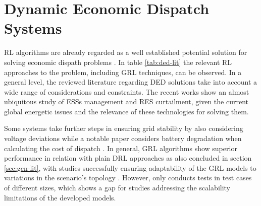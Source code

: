 \section{Dynamic Economic Dispatch Systems} \label{sec:ded}

\ac{RL} algorithms are already regarded as a well established potential solution for solving economic dispath problems \cite{pereraApplicationsReinforcementLearning2021}. In table \ref{tab:ded-lit} the relevant \ac{RL} approaches to the problem, including \ac{GRL} techniques, can be observed. In a general level, the reviewed literature regarding \ac{DED} solutions take into account a wide range of considerations and constraints. The recent works show an almost ubiquitous study of \acp{ESS} management and \ac{RES} curtailment, given the current global energetic issues and the relevance of these technologies for solving them. \par
Some systems \cite{hanAutonomousControlTechnology2023, chenScalableGraphReinforcement2023, zhaoGraphbasedDeepReinforcement2022b} take further steps in ensuring grid stability by also considering voltage deviations while a notable paper considers battery degradation when calculating the cost of dispatch \cite{liuDistributedEconomicDispatch2018b}. In general, \ac{GRL} algorithms show superior performance in relation with plain \ac{DRL} approaches \cite{chenScalableGraphReinforcement2023, liNovelGraphReinforcement2022, zhaoGraphbasedDeepReinforcement2022b} as also concluded in section \ref{sec:gcn-lit}, with studies successfully ensuring adaptability of the \ac{GRL} models to variations in the scenario's topology \cite{chenScalableGraphReinforcement2023, zhaoGraphbasedDeepReinforcement2022b}. However, only \cite{baiAdaptiveActivePower2023b} conducts tests in test cases of different sizes, which shows a gap for studies addressing the scalability limitations of the developed models.



